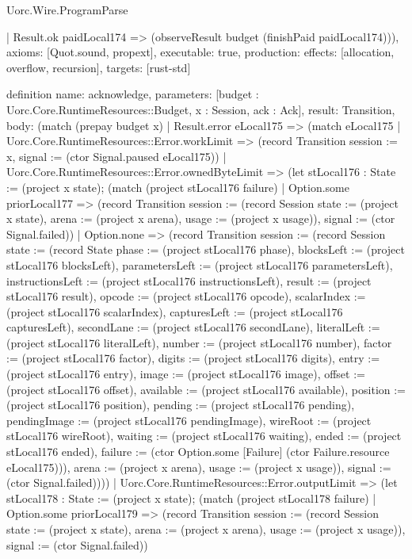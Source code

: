 \begin{lexlean}{Uorc.Wire.ProgramParse}
\begin{semanticmodule}
{    | Result.ok paidLocal174 => (observeResult budget (finishPaid paidLocal174))),
  axioms: [Quot.sound, propext],
  executable: true,
  production: {effects: [allocation, overflow, recursion], targets: [rust-std]}
}

definition{
  name: acknowledge,
  parameters: [budget : Uorc.Core.RuntimeResources::Budget, x : Session, ack : Ack],
  result: Transition,
  body: (match (prepay budget x)
    | Result.error eLocal175 => (match eLocal175
      | Uorc.Core.RuntimeResources::Error.workLimit => (record Transition {session := x, signal := (ctor Signal.paused eLocal175)})
      | Uorc.Core.RuntimeResources::Error.ownedByteLimit => (let stLocal176 : State := (project x state); (match (project stLocal176 failure)
        | Option.some priorLocal177 => (record Transition {session := (record Session {state := (project x state), arena := (project x arena), usage := (project x usage)}), signal := (ctor Signal.failed)})
        | Option.none => (record Transition {session := (record Session {state := (record State {phase := (project stLocal176 phase), blocksLeft := (project stLocal176 blocksLeft), parametersLeft := (project stLocal176 parametersLeft), instructionsLeft := (project stLocal176 instructionsLeft), result := (project stLocal176 result), opcode := (project stLocal176 opcode), scalarIndex := (project stLocal176 scalarIndex), capturesLeft := (project stLocal176 capturesLeft), secondLane := (project stLocal176 secondLane), literalLeft := (project stLocal176 literalLeft), number := (project stLocal176 number), factor := (project stLocal176 factor), digits := (project stLocal176 digits), entry := (project stLocal176 entry), image := (project stLocal176 image), offset := (project stLocal176 offset), available := (project stLocal176 available), position := (project stLocal176 position), pending := (project stLocal176 pending), pendingImage := (project stLocal176 pendingImage), wireRoot := (project stLocal176 wireRoot), waiting := (project stLocal176 waiting), ended := (project stLocal176 ended), failure := (ctor Option.some [Failure] (ctor Failure.resource eLocal175))}), arena := (project x arena), usage := (project x usage)}), signal := (ctor Signal.failed)})))
      | Uorc.Core.RuntimeResources::Error.outputLimit => (let stLocal178 : State := (project x state); (match (project stLocal178 failure)
        | Option.some priorLocal179 => (record Transition {session := (record Session {state := (project x state), arena := (project x arena), usage := (project x usage)}), signal := (ctor Signal.failed)})
}
\end{semanticmodule}
\end{lexlean}
